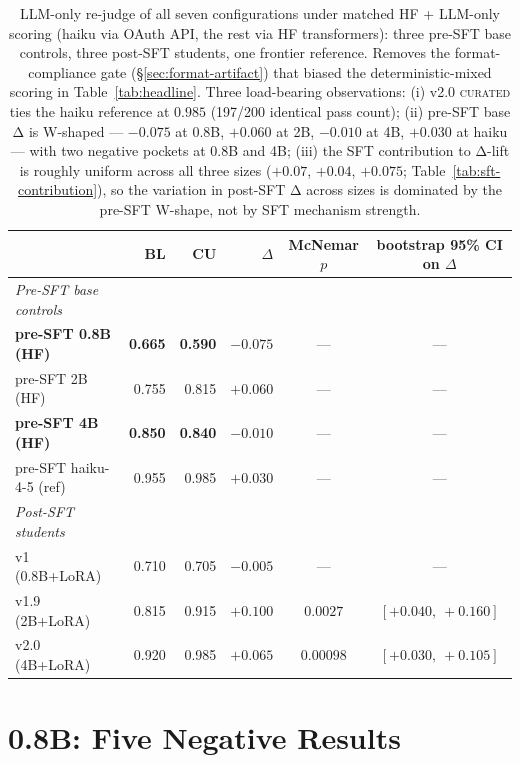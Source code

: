 \documentclass[10pt]{article}
\newcommand{\CU}{\textsc{curated}\xspace}
\begin{document}
\begin{table}[h]
\centering
\small
\begin{tabular}{@{}l r r r c c@{}}
\toprule
& \textbf{BL} & \textbf{CU} & \textbf{$\Delta$} & \textbf{McNemar $p$} & \textbf{bootstrap 95\% CI on $\Delta$} \\
\midrule
\textit{Pre-SFT base controls} \\
\textbf{pre-SFT 0.8B (HF)} & \textbf{0.665} & \textbf{0.590} & $\boldsymbol{-0.075}$ & --- & --- \\
pre-SFT 2B (HF)            & 0.755 & 0.815 & $+0.060$ & --- & --- \\
\textbf{pre-SFT 4B (HF)}   & \textbf{0.850} & \textbf{0.840} & $\boldsymbol{-0.010}$ & --- & --- \\
pre-SFT haiku-4-5 (ref)    & 0.955 & 0.985 & $+0.030$ & --- & --- \\
\addlinespace
\textit{Post-SFT students} \\
v1   (0.8B+LoRA)   & 0.710 & 0.705 & $-0.005$ & --- & --- \\
v1.9 (2B+LoRA)     & 0.815 & 0.915 & $+0.100$ & $0.0027$ & $[+0.040,\ +0.160]$ \\
v2.0 (4B+LoRA)     & 0.920 & 0.985 & $+0.065$ & $0.00098$ & $[+0.030,\ +0.105]$ \\
\bottomrule
\end{tabular}
\caption{LLM-only re-judge of all seven configurations under matched HF + LLM-only scoring (haiku via OAuth API, the rest via HF transformers): three pre-SFT base controls, three post-SFT students, one frontier reference. Removes the format-compliance gate (\S\ref{sec:format-artifact}) that biased the deterministic-mixed scoring in Table~\ref{tab:headline}. Three load-bearing observations: (i) v2.0 \CU{} ties the haiku reference at $0.985$ (197/200 identical pass count); (ii) pre-SFT base Δ is W-shaped --- $-0.075$ at 0.8B, $+0.060$ at 2B, $-0.010$ at 4B, $+0.030$ at haiku --- with two negative pockets at 0.8B and 4B; (iii) the SFT contribution to Δ-lift is roughly uniform across all three sizes ($+0.07$, $+0.04$, $+0.075$; Table~\ref{tab:sft-contribution}), so the variation in post-SFT Δ across sizes is dominated by the pre-SFT W-shape, not by SFT mechanism strength.}
\label{tab:llm-only}
\end{table}

\section{0.8B: Five Negative Results}
\end{document}
